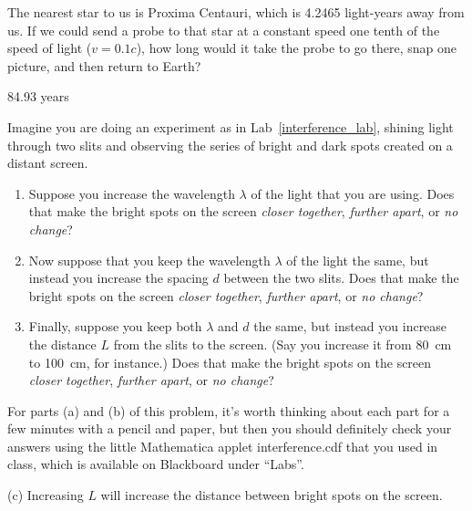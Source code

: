 \begin{Exercise}
The nearest star to us is Proxima Centauri, which is 4.2465 light-years away from us.  If we could send a probe to that star at a constant speed one tenth of the speed of light ($v=0.1c$), how long would it take the probe to go there, snap one picture, and then return to Earth?
\end{Exercise}
\begin{Answer}
84.93 years
\end{Answer}

\begin{Exercise}
Imagine you are doing an experiment as in Lab~\ref{interference_lab}, shining light through two slits and observing the series of bright and dark spots created on a distant screen.
\begin{enumerate}[nosep,label=(\alph*)]
\item Suppose you increase the wavelength $\lambda$ of the light that you are using.  Does that make the bright spots on the screen \textit{closer together}, \textit{further apart}, or \textit{no change}?  
\item Now suppose that you keep the wavelength $\lambda$ of the light the same, but instead you increase the spacing $d$ between the two slits.  Does that make the bright spots on the screen \textit{closer together}, \textit{further apart}, or \textit{no change}?  
\item Finally, suppose you keep both $\lambda$ and $d$ the same, but instead you increase the distance $L$ from the slits to the screen.  (Say you increase it from 80~cm to 100~cm, for instance.)  Does that make the bright spots on the screen \textit{closer together}, \textit{further apart}, or \textit{no change}?  
\end{enumerate}
For parts (a) and (b) of this problem, it's worth thinking about each part for a few minutes with a pencil and paper, but then you should definitely check your answers using the little Mathematica applet interference.cdf that you used in class, which is available on Blackboard under ``Labs''.
\end{Exercise}
\begin{Answer}
(c) Increasing $L$ will increase the distance between bright spots on the screen.
\end{Answer}

